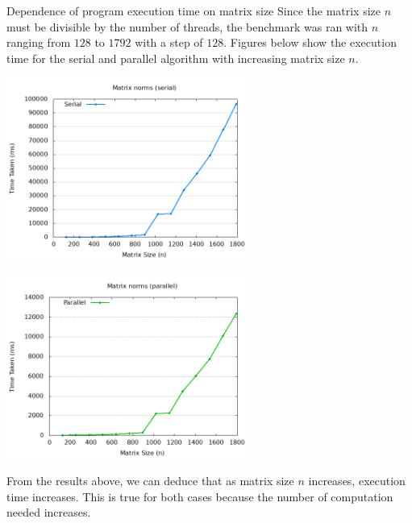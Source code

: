 \documentclass[12pt]{article}
\begin{document}
\begin{section}{Dependence of program execution time on matrix size}
 Since the matrix size $n$ must be divisible by the number of threads, the benchmark was ran with $n$ ranging from
 $128$ to $1792$ with a step of $128$. Figures below show the execution time for the serial and parallel algorithm with
 increasing matrix size $n$.

 \begin{center}
     \begin{minipage}{0.48\linewidth}
         \includegraphics*[width=8cm]{images/benchmark_serial.png}
     \end{minipage}
     \begin{minipage}{0.48\linewidth}
         \includegraphics*[width=8cm]{images/benchmark_parallel.png}
     \end{minipage}
 \end{center}

 From the results above, we can deduce that as matrix size $n$ increases, execution time increases. This is true for both cases because
 the number of computation needed increases.

\end{section}
\end{document}
